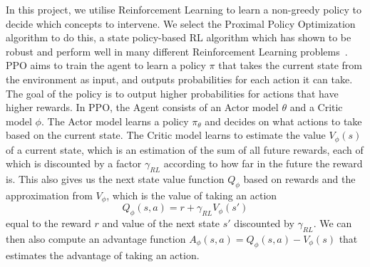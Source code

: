 In this project, we utilise Reinforcement Learning 
to learn a non-greedy policy to decide which
concepts to intervene. We select
 the Proximal Policy Optimization~\cite{ppo}
algorithm to do this, a state policy-based RL algorithm which has shown to be robust 
and perform well in many different Reinforcement Learning problems~\cite{ ppo-2, ppo-1, ppo-3}.
PPO aims to train the agent to learn a policy $\pi$ that takes the current state from the environment as input,
and outputs probabilities for each action it can take.
The goal of the policy
is to output higher probabilities for actions that have higher rewards.
In PPO,
the Agent consists of an Actor model $\theta$ and a Critic model $\phi$.
The Actor model learns a policy $\pi_\theta$ and decides on what actions to take based on 
the current state.
The Critic model learns 
to estimate the value $V_\phi(s)$ of a current state, which is an estimation of the sum of all future rewards, each of which is discounted 
by a factor $\gamma_{RL}$ according to how 
far in the future the reward is.
This also gives us the next state value function $Q_\phi$ 
based on rewards
and the approximation from $V_\phi$,
which is the value of taking an action 
\begin{equation}\label{equation:next-state-value}
Q_\phi(s,a) = 
r + \gamma_{RL} V_\phi(s')
\end{equation}
equal to the reward $r$ and value 
of the next state $s'$ discounted by $\gamma_{RL}$.
We can then also compute
an advantage function $A_\phi(s,a) = Q_\phi(s,a) - V_\phi(s)$
that estimates the advantage of taking an action.

